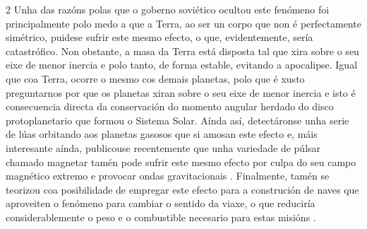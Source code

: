 \begin{refsection}
\begin{multicols}{2}
Unha das razóns polas que o goberno soviético ocultou este fenómeno foi
principalmente polo medo a que a Terra, ao ser un corpo que non é perfectamente
simétrico, puidese sufrir este mesmo efecto, o que, evidentemente, sería
catastrófico. Non obstante, a masa da Terra está disposta tal que xira sobre o
seu eixe de menor inercia e polo tanto, de forma estable, evitando a
apocalipse. Igual que coa Terra, ocorre o mesmo cos demais planetas, polo que é
xusto preguntarnos por que os planetas xiran sobre o seu eixe de menor inercia
e isto é consecuencia directa da conservación do momento angular herdado do
disco protoplanetario que formou o Sistema Solar. Aínda así, detectáronse unha
serie de lúas orbitando aos planetas gasosos que si amosan este efecto e, máis
interesante aínda, publicouse recentemente que unha variedade de púlsar chamado
magnetar tamén pode sufrir este mesmo efecto por culpa do seu campo magnético
extremo e provocar ondas gravitacionais \cite{Kantor2023}. Finalmente, tamén se
teorizou coa posibilidade de empregar este efecto para a construción de naves
que aproveiten o fenómeno para cambiar o sentido da viaxe, o que reduciría
considerablemente o peso e o combustible necesario para estas misións
\cite{Ono2022}.

\printbibliography

\end{multicols}
\end{refsection}

